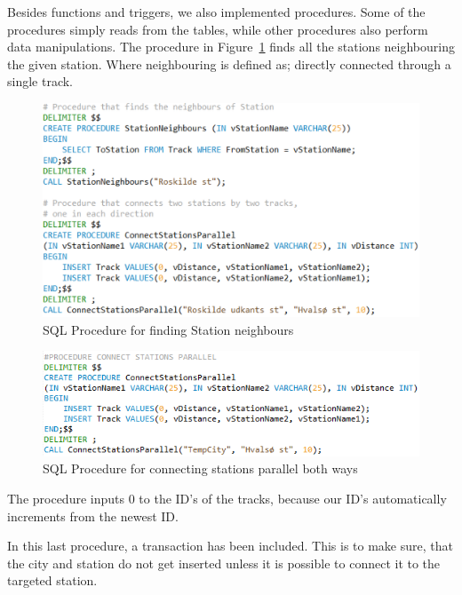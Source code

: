 Besides functions and triggers, we also implemented procedures. Some of the 
procedures simply reads from the tables, while other procedures also perform 
data manipulations. The procedure in Figure~\ref{fig:neighbors} finds all the 
stations neighbouring the given station. Where neighbouring is defined as; 
directly connected through a single track.

\begin{figure}[ht!]
    \centering
    \includegraphics[scale=.75]{img/SQL_PROCEDURE_Neighbours}
    \caption{SQL Procedure for finding Station neighbours}
    \label{fig:neighbors}
\end{figure}

\begin{figure}[ht!]
    \centering
    \includegraphics[scale=.75]{img/SQL_PROCEDURE_ConnectParallel}
    \caption{SQL Procedure for connecting stations parallel both ways}
    \label{fig:connectstation}
\end{figure}

The procedure inputs 0 to the ID's of the tracks, because our ID's 
automatically increments from the newest ID.

In this last procedure, a transaction has been included. This is to make sure, 
that the city and station do not get inserted unless it is possible to connect 
it to the targeted station.


